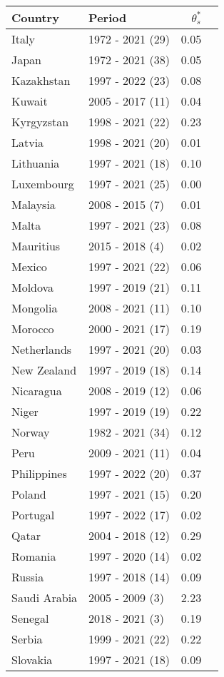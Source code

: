 \begin{table}[H]
{{\centering
\begin{tabular}{llrr}
\toprule
Country & Period & $\theta_s^*$\\
\midrule
Italy & 1972 - 2021 (29) & 0.05\\
Japan & 1972 - 2021 (38) & 0.05\\
Kazakhstan & 1997 - 2022 (23) & 0.08\\
Kuwait & 2005 - 2017 (11) & 0.04\\
Kyrgyzstan & 1998 - 2021 (22) & 0.23\\
\addlinespace
Latvia & 1998 - 2021 (20) & 0.01\\
Lithuania & 1997 - 2021 (18) & 0.10\\
Luxembourg & 1997 - 2021 (25) & 0.00\\
Malaysia & 2008 - 2015 (7) & 0.01\\
Malta & 1997 - 2021 (23) & 0.08\\
\addlinespace
Mauritius & 2015 - 2018 (4) & 0.02\\
Mexico & 1997 - 2021 (22) & 0.06\\
Moldova & 1997 - 2019 (21) & 0.11\\
Mongolia & 2008 - 2021 (11) & 0.10\\
Morocco & 2000 - 2021 (17) & 0.19\\
\addlinespace
Netherlands & 1997 - 2021 (20) & 0.03\\
New Zealand & 1997 - 2019 (18) & 0.14\\
Nicaragua & 2008 - 2019 (12) & 0.06\\
Niger & 1997 - 2019 (19) & 0.22\\
Norway & 1982 - 2021 (34) & 0.12\\
\addlinespace
Peru & 2009 - 2021 (11) & 0.04\\
Philippines & 1997 - 2022 (20) & 0.37\\
Poland & 1997 - 2021 (15) & 0.20\\
Portugal & 1997 - 2022 (17) & 0.02\\
Qatar & 2004 - 2018 (12) & 0.29\\
\addlinespace
Romania & 1997 - 2020 (14) & 0.02\\
Russia & 1997 - 2018 (14) & 0.09\\
Saudi Arabia & 2005 - 2009 (3) & 2.23\\
Senegal & 2018 - 2021 (3) & 0.19\\
Serbia & 1999 - 2021 (22) & 0.22\\
\addlinespace
Slovakia & 1997 - 2021 (18) & 0.09\\

\end{tabular}}}
\end{table}
